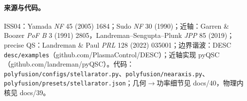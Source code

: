 \documentclass[UTF8,11pt]{ctexart}
\begin{document}
\paragraph{来源与代码。}
ISS04：Yamada \emph{NF} 45 (2005) 1684；Sudo \emph{NF} 30 (1990)；近轴：Garren \& Boozer \emph{PoF B} 3 (1991) 2805，Landreman--Sengupta--Plunk \emph{JPP} 85 (2019)；precise QS：Landreman \& Paul \emph{PRL} 128 (2022) 035001；边界谐波：DESC \texttt{desc/examples}（github.com/PlasmaControl/DESC）；近轴实现 pyQSC（github.com/landreman/pyQSC）。代码：\texttt{polyfusion/configs/stellarator.py}、\texttt{polyfusion/nearaxis.py}、\texttt{polyfusion/presets/stellarator.json}；几何$\to$功率细节见 docs/40，物理内核见 docs/39。
\end{document}
